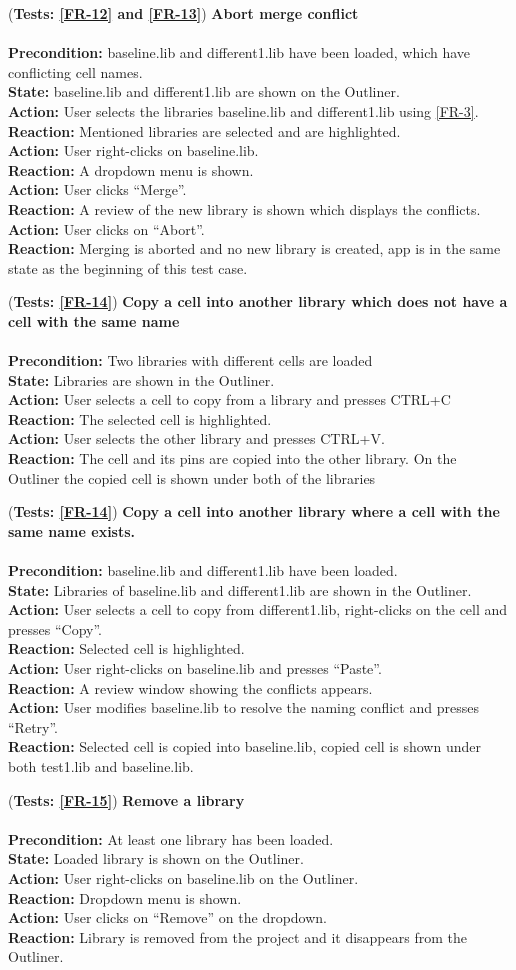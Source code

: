 \documentclass[10pt,a4paper]{report}
\newcommand{\precondition}[1]{
    \textbf{Precondition: } #1 \leavevmode \\
}
\newcommand{\action}[1]{
    \textbf{Action: } #1 \leavevmode \\
}
\newcommand{\state}[1]{
    \textbf{State: } #1 \leavevmode \\
}
\newcommand{\reaction}[1]{
    \textbf{Reaction: } #1 \leavevmode \\
}
\newcommand{\GTCDescription}[2]{
    (\textbf{Tests: #1}) \textbf{#2} \leavevmode \\
}
\begin{document}
\begin{GTC}
    \item \GTCDescription{\ref{FR-12} and \ref{FR-13}}{Abort merge conflict} \leavevmode \\ \precondition{baseline.lib and different1.lib have been loaded, which have conflicting cell names.}\state{baseline.lib and different1.lib are shown on the Outliner.}\action{User selects the libraries baseline.lib and different1.lib using \ref{FR-3}.}\reaction{Mentioned libraries are selected and are highlighted.}\action{User right-clicks on baseline.lib.}\reaction{A dropdown menu is shown.}\action{User clicks “Merge”.}\reaction{A review of the new library is shown which displays the conflicts.}\action{User clicks on “Abort”.}\reaction{Merging is aborted and no new library is created, app is in the same state as the beginning of this test case.
}
    
    \item \GTCDescription{\ref{FR-14}}{Copy a cell into another library which does not have a cell with the same name} \leavevmode \\ \precondition{Two libraries with different cells are loaded}\state{ Libraries are shown in the Outliner.}\action{User selects a cell to copy from a library and presses CTRL+C}\reaction{The selected cell is highlighted.}\action{User selects the other library and presses CTRL+V.}\reaction{The cell and its pins are copied into the other library. On the Outliner the copied cell is shown under both of the libraries}
    
    \item \GTCDescription{\ref{FR-14}}{Copy a cell into another library where a cell with the same name exists.} \leavevmode \\ \precondition{baseline.lib and different1.lib have been loaded.}\state{Libraries of baseline.lib and different1.lib are shown in the Outliner.}\action{User selects a cell to copy from different1.lib, right-clicks on the cell and presses “Copy”.}\reaction{Selected cell is highlighted.}\action{User right-clicks on baseline.lib and presses “Paste”.}\reaction{A review window showing the conflicts appears. }\action{User modifies baseline.lib to resolve the naming conflict and presses “Retry”.}\reaction{Selected cell is copied into baseline.lib, copied cell is shown under both test1.lib and baseline.lib.
}
    
    \item \GTCDescription{\ref{FR-15}}{Remove a library} \leavevmode \\ \precondition{At least one library has been loaded.	}\state{Loaded library is shown on the Outliner.}\action{User right-clicks on baseline.lib on the Outliner.}\reaction{Dropdown menu is shown.}\action{User clicks on “Remove” on the dropdown.}\reaction{Library is removed from the project and it disappears from the Outliner.
}
    

\end{GTC}
\end{document}
